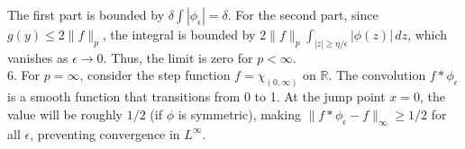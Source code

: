 \begin{solution}
\[\]
The first part is bounded by $\delta \int |\phi_\epsilon| = \delta$. For the second part, since $g(y) \leq 2\|f\|_p$, the integral is bounded by $2\|f\|_p \int_{|z| \geq \eta/\epsilon} |\phi(z)| \, dz$, which vanishes as $\epsilon \to 0$. Thus, the limit is zero for $p < \infty$. \\[2ex]
6. For $p = \infty$, consider the step function $f = \chi_{(0, \infty)}$ on $\mathbb{R}$. The convolution $f * \phi_\epsilon$ is a smooth function that transitions from 0 to 1. At the jump point $x=0$, the value will be roughly $1/2$ (if $\phi$ is symmetric), making $\|f * \phi_\epsilon - f\|_\infty \geq 1/2$ for all $\epsilon$, preventing convergence in $L^\infty$.
\end{solution}
